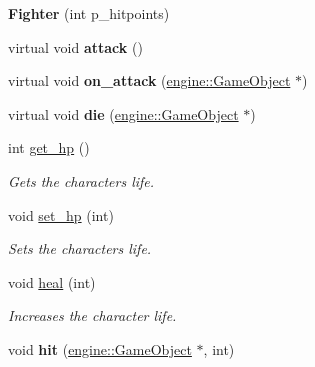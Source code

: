 \begin{DoxyCompactItemize}
\item 
{\bfseries Fighter} (int p\+\_\+hitpoints)\hypertarget{classmindscape_1_1_fighter_a9d9d91fbd922093052ddc11d0eb25090}{}\label{classmindscape_1_1_fighter_a9d9d91fbd922093052ddc11d0eb25090}

\item 
virtual void {\bfseries attack} ()\hypertarget{classmindscape_1_1_fighter_ae0327ee59ec712da56d4ddf7f23e8fae}{}\label{classmindscape_1_1_fighter_ae0327ee59ec712da56d4ddf7f23e8fae}

\item 
virtual void {\bfseries on\+\_\+attack} (\hyperlink{classengine_1_1_game_object}{engine\+::\+Game\+Object} $\ast$)\hypertarget{classmindscape_1_1_fighter_a78c815109013e3ce23ca6cba8d9c4e73}{}\label{classmindscape_1_1_fighter_a78c815109013e3ce23ca6cba8d9c4e73}

\item 
virtual void {\bfseries die} (\hyperlink{classengine_1_1_game_object}{engine\+::\+Game\+Object} $\ast$)\hypertarget{classmindscape_1_1_fighter_a6cdc510f287d740f57ac76d5ae220c1c}{}\label{classmindscape_1_1_fighter_a6cdc510f287d740f57ac76d5ae220c1c}

\item 
int \hyperlink{classmindscape_1_1_fighter_a36f9714df967354dc98f97bf0eabe6b2}{get\+\_\+hp} ()
\begin{DoxyCompactList}\small\item\em Gets the character\textquotesingle{}s life. \end{DoxyCompactList}\item 
void \hyperlink{classmindscape_1_1_fighter_a0c048e02ee77ba088a47c51211dbf6c7}{set\+\_\+hp} (int)
\begin{DoxyCompactList}\small\item\em Sets the character\textquotesingle{}s life. \end{DoxyCompactList}\item 
void \hyperlink{classmindscape_1_1_fighter_a8672d19748aba79323c77a2b93166d1d}{heal} (int)
\begin{DoxyCompactList}\small\item\em Increases the character life. \end{DoxyCompactList}\item 
void {\bfseries hit} (\hyperlink{classengine_1_1_game_object}{engine\+::\+Game\+Object} $\ast$, int)\hypertarget{classmindscape_1_1_fighter_a76feabe253ef5ca18450c9cf2df15bdf}{}\label{classmindscape_1_1_fighter_a76feabe253ef5ca18450c9cf2df15bdf}


\end{DoxyCompactItemize}
